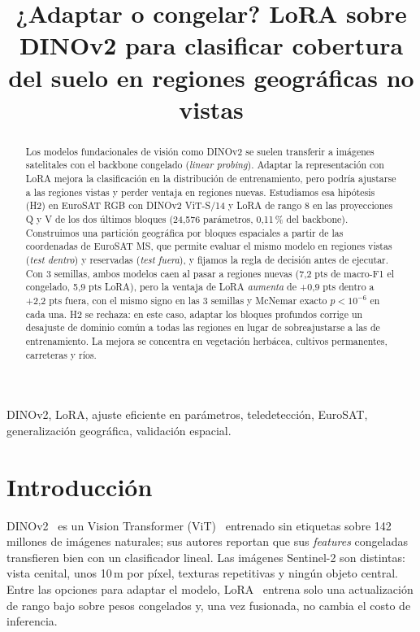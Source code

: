 \documentclass[conference,a4paper]{IEEEtran}
\begin{document}
\title{¿Adaptar o congelar? LoRA sobre DINOv2 para clasificar cobertura del suelo en regiones geográficas no vistas}

\author{
}

\maketitle

\begin{abstract}
Los modelos fundacionales de visión como DINOv2 se suelen transferir a imágenes satelitales con el backbone congelado (\emph{linear probing}). Adaptar la representación con LoRA mejora la clasificación en la distribución de entrenamiento, pero podría ajustarse a las regiones vistas y perder ventaja en regiones nuevas. Estudiamos esa hipótesis (H2) en EuroSAT RGB con DINOv2 ViT-S/14 y LoRA de rango 8 en las proyecciones Q y V de los dos últimos bloques (24{,}576 parámetros, 0{,}11\,\% del backbone). Construimos una partición geográfica por bloques espaciales a partir de las coordenadas de EuroSAT MS, que permite evaluar el mismo modelo en regiones vistas (\emph{test dentro}) y reservadas (\emph{test fuera}), y fijamos la regla de decisión antes de ejecutar. Con 3 semillas, ambos modelos caen al pasar a regiones nuevas (7{,}2 pts de macro-F1 el congelado, 5{,}9 pts LoRA), pero la ventaja de LoRA \emph{aumenta} de +0{,}9 pts dentro a +2{,}2 pts fuera, con el mismo signo en las 3 semillas y McNemar exacto $p<10^{-6}$ en cada una. H2 se rechaza: en este caso, adaptar los bloques profundos corrige un desajuste de dominio común a todas las regiones en lugar de sobreajustarse a las de entrenamiento. La mejora se concentra en vegetación herbácea, cultivos permanentes, carreteras y ríos.
\end{abstract}

\begin{IEEEkeywords}
DINOv2, LoRA, ajuste eficiente en parámetros, teledetección, EuroSAT, generalización geográfica, validación espacial.
\end{IEEEkeywords}

\section{Introducción}
DINOv2~\cite{oquab2024} es un Vision Transformer (ViT)~\cite{dosovitskiy2021} entrenado sin etiquetas sobre 142 millones de imágenes naturales; sus autores reportan que sus \emph{features} congeladas transfieren bien con un clasificador lineal. Las imágenes Sentinel-2 son distintas: vista cenital, unos 10\,m por píxel, texturas repetitivas y ningún objeto central. Entre las opciones para adaptar el modelo, LoRA~\cite{hu2022} entrena solo una actualización de rango bajo sobre pesos congelados y, una vez fusionada, no cambia el costo de inferencia.
\end{document}

